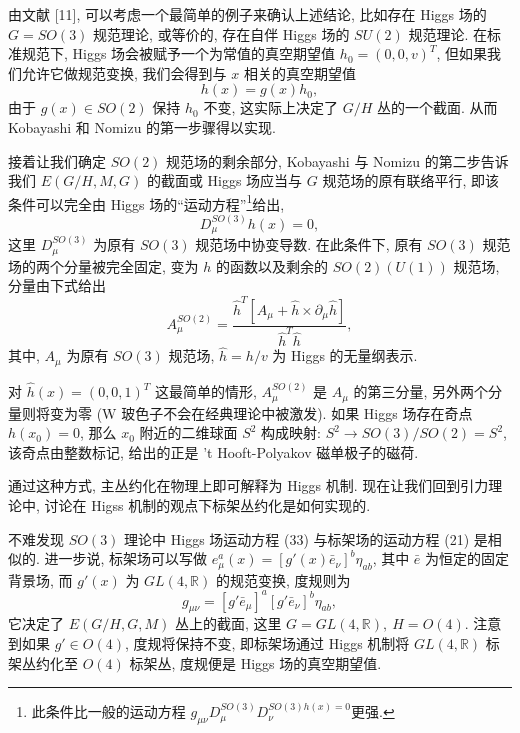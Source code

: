 \documentclass{article}
\begin{document}
由文献 [11], 可以考虑一个最简单的例子来确认上述结论, 比如存在 Higgs 场的 $G=SO(3)$ 规范理论, 或等价的, 存在自伴 Higgs 场的 $SU(2)$ 规范理论. 在标准规范下, Higgs 场会被赋予一个为常值的真空期望值 $h_{0}=(0,0,v)^{T}$, 但如果我们允许它做规范变换, 我们会得到与 $x$ 相关的真空期望值
\begin{equation}
h(x)=g(x)h_{0},
\end{equation}
由于 $g(x)\in SO(2)$ 保持 $h_{0}$ 不变, 这实际上决定了 $G/H$ 丛的一个截面. 从而 Kobayashi 和 Nomizu 的第一步骤得以实现.

接着让我们确定 $SO(2)$ 规范场的剩余部分, Kobayashi 与 Nomizu 的第二步告诉我们  $E(G/H,M,G)$ 的截面或 Higgs 场应当与 $G$ 规范场的原有联络平行, 即该条件可以完全由 Higgs 场的``运动方程''\footnote{此条件比一般的运动方程 $g_{\mu\nu}D_{\mu}^{SO(3)}D_{\nu}^{SO(3)h(x)=0}$更强.}给出,
\begin{equation}
D_{\mu}^{SO(3)}h(x)=0,
\end{equation}
这里 $D_{\mu}^{SO(3)}$ 为原有 $SO(3)$ 规范场中协变导数. 在此条件下, 原有 $SO(3)$ 规范场的两个分量被完全固定, 变为 $h$ 的函数以及剩余的 $SO(2)(U(1))$ 规范场, 分量由下式给出
\begin{equation}
A_{\mu}^{SO(2)}=\frac{\hat{h}^{T}[A_{\mu}+\hat{h}\times \partial_{\mu}\hat{h}]}{\hat{h}^{T}\hat{h}},
\end{equation}
其中, $A_{\mu}$ 为原有 $SO(3)$ 规范场, $\hat{h}=h/v$ 为 Higgs 的无量纲表示.

对 $\hat{h}(x)=(0,0,1)^{T}$ 这最简单的情形, $A_{\mu}^{SO(2)}$ 是 $A_{\mu}$ 的第三分量, 另外两个分量则将变为零 (W 玻色子不会在经典理论中被激发). 如果 Higgs 场存在奇点 $h(x_{0})=0$, 那么 $x_{0}$ 附近的二维球面 $S^{2}$ 构成映射: $S^{2}\rightarrow SO(3)/SO(2)=S^{2}$, 该奇点由整数标记, 给出的正是 't Hooft-Polyakov 磁单极子的磁荷.

通过这种方式, 主丛约化在物理上即可解释为 Higgs 机制. 现在让我们回到引力理论中, 讨论在 Higss 机制的观点下标架丛约化是如何实现的.

不难发现 $SO(3)$ 理论中 Higgs 场运动方程 (33) 与标架场的运动方程 (21) 是相似的. 进一步说, 标架场可以写做 $e_{\mu}^{a}(x)=[g'(x)\bar{e}_{\nu}]^{b}\eta_{ab}$, 其中 $\bar{e}$ 为恒定的固定背景场, 而 $g'(x)$ 为 $GL(4,\mathbb{R})$ 的规范变换, 度规则为
\begin{equation}
g_{\mu\nu}=[g'\bar{e}_{\mu}]^{a}[g'\bar{e}_{\nu}]^{b}\eta_{ab},
\end{equation}
它决定了 $E(G/H,G,M)$ 丛上的截面, 这里 $G=GL(4, \mathbb{R}),\ H=O(4)$. 注意到如果  $g'\in O(4)$, 度规将保持不变, 即标架场通过 Higgs 机制将 $GL(4, \mathbb{R})$ 标架丛约化至 $O(4)$ 标架丛, 度规便是 Higgs 场的真空期望值.
\end{document}
